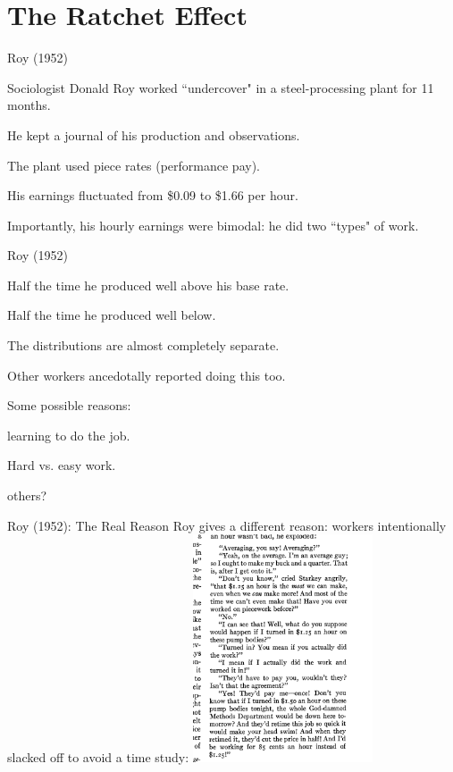 \documentclass[aspectratio=169,usenames,dvipsnames]{beamer}
\newenvironment{wideitemize}{\itemize\addtolength{\itemsep}{10pt}}{\enditemize}
\begin{document}
\section{The Ratchet Effect}

\begin{frame}{Roy (1952)}
\begin{wideitemize}
    \item Sociologist Donald Roy worked ``undercover" in a steel-processing plant for 11 months.
    \item He kept a journal of his production and observations.
    \item The plant used piece rates (performance pay).
    \item His earnings fluctuated from \$0.09 to \$1.66 per hour.
    \item Importantly, his hourly earnings were bimodal: he did two ``types" of work.
\end{wideitemize}
\end{frame}

\begin{frame}{Roy (1952)}
\begin{wideitemize}
    \item Half the time he produced well above his base rate.
    \item Half the time he produced well below.
    \item The distributions are almost completely separate.
    \item Other workers ancedotally reported doing this too.
    \item Some possible reasons:
    \begin{wideitemize}
        \item learning to do the job.
        \item Hard vs. easy work.
        \item others?
    \end{wideitemize}
\end{wideitemize}
\end{frame}

\begin{frame}[c]{Roy (1952): The Real Reason}
 Roy gives a different reason: workers intentionally slacked off to avoid a time study:
 \centering
\includegraphics[width=0.4\textwidth]{pictures/roy_ratchet.png}
\end{frame}
\end{document}
